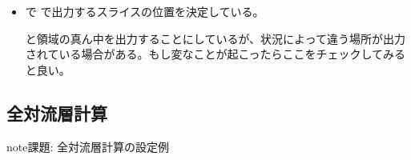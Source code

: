 \documentclass[letterpaper,10pt,dvipdfmx,report]{sphinxmanual}
\begin{document}
\begin{itemize}
\begin{description}
\end{description}

\item {} \begin{description}
\sphinxAtStartPar
{} で  で出力するスライスの位置を決定している。

\sphinxAtStartPar
と領域の真ん中を出力することにしているが、状況によって違う場所が出力されている場合がある。もし変なことが起こったらここをチェックしてみると良い。

\end{description}

\end{itemize}


\subsection{全対流層計算}
\label{\detokenize{typical_case:id9}}
\begin{sphinxadmonition}{note}{\label{\detokenize{typical_case:id10}}課題:}
\sphinxAtStartPar
全対流層計算の設定例
\end{sphinxadmonition}
\end{document}
